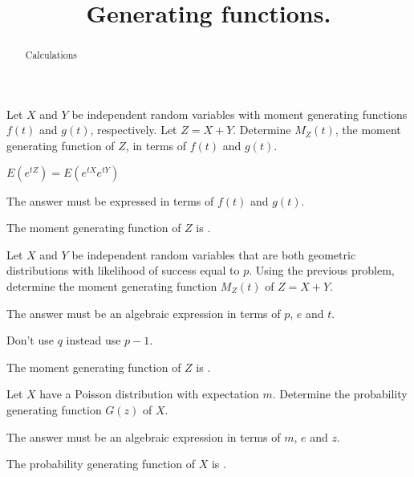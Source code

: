 \documentclass{ximera}
\title{Generating functions.}
\begin{document}
\begin{abstract}
Calculations
\end{abstract}
\maketitle

\begin{question} 
Let $X$ and $Y$ be independent random variables with moment generating functions $f(t)$ and $g(t)$, respectively. Let $Z=X+Y$. Determine $M_{Z}(t)$, the moment generating function of $Z$, in terms of $f(t)$ and $g(t)$.
     \begin{hint}
          $E(e^{tZ}) = E(e^{tX}e^{tY})$
     \end{hint}
     \begin{hint}
          The answer must be expressed in terms of $f(t)$ and $g(t)$.
     \end{hint}
     \begin{solution}
          The moment generating function of $Z$ is .
     \end{solution}
\end{question}

\begin{question}
Let $X$ and $Y$ be independent random variables that are both geometric distributions with likelihood of success equal to $p$. Using the previous problem, determine the moment generating function $M_{Z}(t)$ of $Z=X+Y$.
     \begin{hint}
          The answer must be an algebraic expression in terms of $p$, $e$ and $t$. 
     \end{hint}
     \begin{hint}
          Don't use $q$ instead use $p-1$.
     \end{hint} 
     \begin{solution}
          The moment generating function of $Z$ is .
     \end{solution}
\end{question}

\begin{question}
Let $X$ have a Poisson distribution with expectation $m$. Determine the probability generating function $G(z)$ of $X$.
     \begin{hint}
          The answer must be an algebraic expression in terms of $m$, $e$ and $z$.
     \end{hint}
     \begin{solution}
          The probability generating function of $X$ is .
     \end{solution}
\end{question}
\end{document}
